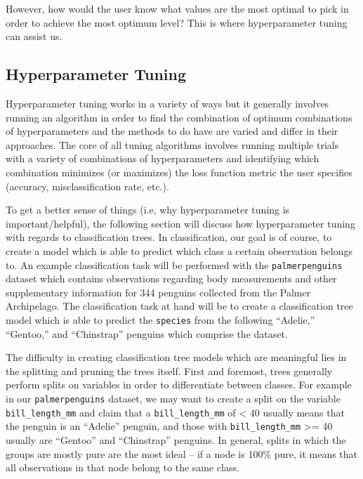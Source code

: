 \documentclass[12pt]{article}
\begin{document}
However, how would the user know what values are the most optimal to
pick in order to achieve the most optimum level? This is where
hyperparameter tuning can assist us.

\hypertarget{hyperparameter-tuning}{%
\subsection{Hyperparameter Tuning}\label{hyperparameter-tuning}}

\label{sec:tuning}

Hyperparameter tuning works in a variety of ways but it generally
involves running an algorithm in order to find the combination of
optimum combinations of hyperparameters and the methods to do have are
varied and differ in their approaches. The core of all tuning algorithms
involves running multiple trials with a variety of combinations of
hyperparameters and identifying which combination minimizes (or
maximizes) the loss function metric the user specifies (accuracy,
misclassification rate, etc.).

To get a better sense of things (i.e, why hyperparameter tuning is
important/helpful), the following section will discuss how
hyperparameter tuning with regards to classification trees. In
classification, our goal is of course, to create a model which is able
to predict which class a certain observation belongs to. An example
classification task will be performed with the \texttt{palmerpenguins}
dataset which contains observations regarding body measurements and
other supplementary information for 344 penguins collected from the
Palmer Archipelago. The classification task at hand will be to create a
classification tree model which is able to predict the \texttt{species}
from the following ``Adelie,'' ``Gentoo,'' and ``Chinstrap'' penguins
which comprise the dataset.

The difficulty in creating classification tree models which are
meaningful lies in the splitting and pruning the trees itself. First and
foremost, trees generally perform splits on variables in order to
differentiate between classes. For example in our
\texttt{palmerpenguins} dataset, we may want to create a split on the
variable \texttt{bill\_length\_mm} and claim that a
\texttt{bill\_length\_mm} of \textless{} 40 usually means that the
penguin is an ``Adelie'' penguin, and those with
\texttt{bill\_length\_mm} \textgreater= 40 usually are ``Gentoo'' and
``Chinstrap'' penguins. In general, splits in which the groups are
mostly pure are the most ideal -- if a node is 100\% pure, it means that
all observations in that node belong to the same class.
\end{document}
